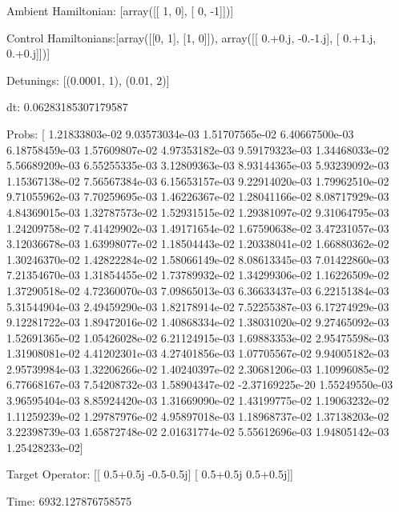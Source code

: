 \documentclass{article}
\begin{document}
    

\newpage

Ambient Hamiltonian: [array([[ 1,  0],
       [ 0, -1]])]

Control Hamiltonians:[array([[0, 1],
       [1, 0]]), array([[ 0.+0.j, -0.-1.j],
       [ 0.+1.j,  0.+0.j]])]

Detunings: [(0.0001, 1), (0.01, 2)]

 dt: 0.06283185307179587

Probs: [  1.21833803e-02   9.03573034e-03   1.51707565e-02   6.40667500e-03
   6.18758459e-03   1.57609807e-02   4.97353182e-03   9.59179323e-03
   1.34468033e-02   5.56689209e-03   6.55255335e-03   3.12809363e-03
   8.93144365e-03   5.93239092e-03   1.15367138e-02   7.56567384e-03
   6.15653157e-03   9.22914020e-03   1.79962510e-02   9.71055962e-03
   7.70259695e-03   1.46226367e-02   1.28041166e-02   8.08717929e-03
   4.84369015e-03   1.32787573e-02   1.52931515e-02   1.29381097e-02
   9.31064795e-03   1.24209758e-02   7.41429902e-03   1.49171654e-02
   1.67590638e-02   3.47231057e-03   3.12036678e-03   1.63998077e-02
   1.18504443e-02   1.20338041e-02   1.66880362e-02   1.30246370e-02
   1.42822284e-02   1.58066149e-02   8.08613345e-03   7.01422860e-03
   7.21354670e-03   1.31854455e-02   1.73789932e-02   1.34299306e-02
   1.16226509e-02   1.37290518e-02   4.72360070e-03   7.09865013e-03
   6.36633437e-03   6.22151384e-03   5.31544904e-03   2.49459290e-03
   1.82178914e-02   7.52255387e-03   6.17274929e-03   9.12281722e-03
   1.89472016e-02   1.40868334e-02   1.38031020e-02   9.27465092e-03
   1.52691365e-02   1.05426028e-02   6.21124915e-03   1.69883353e-02
   2.95475598e-03   1.31908081e-02   4.41202301e-03   4.27401856e-03
   1.07705567e-02   9.94005182e-03   2.95739984e-03   1.32206266e-02
   1.40240397e-02   2.30681206e-03   1.10996085e-02   6.77668167e-03
   7.54208732e-03   1.58904347e-02  -2.37169225e-20   1.55249550e-03
   3.96595404e-03   8.85924420e-03   1.31669090e-02   1.43199775e-02
   1.19063232e-02   1.11259239e-02   1.29787976e-02   4.95897018e-03
   1.18968737e-02   1.37138203e-02   3.22398739e-03   1.65872748e-02
   2.01631774e-02   5.55612696e-03   1.94805142e-03   1.25428233e-02]

Target Operator: [[ 0.5+0.5j -0.5-0.5j]
 [ 0.5+0.5j  0.5+0.5j]]

Time: 6932.127876758575
\end{document}
